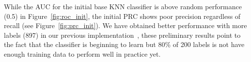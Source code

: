 While the AUC for the initial base KNN classifier is above random performance (0.5) in Figure~\ref{fig:roc_init}, the initial PRC shows poor precision regardless of recall (see Figure~\ref{fig:prc_init}).
We have obtained better performance with more labels (897) in our previous implementation~\cite{tchoua2019polyner}, these preliminary results point to the fact that the classifier is beginning to learn but 80\% of 200 labels is not have enough training data to perform well in practice yet.

